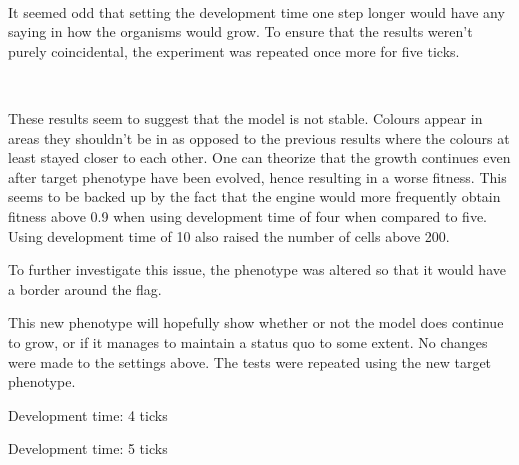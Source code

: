 \begin{center}
	~
	~
\end{center}

It seemed odd that setting the development time one step longer would have any saying in how the organisms would grow. To ensure that the results weren't purely coincidental, the experiment was repeated once more for five ticks.

\begin{center}
	~
	~
\end{center}

These results seem to suggest that the model is not stable. Colours appear in areas they shouldn't be in as opposed to the previous results where the colours at least stayed closer to each other. One can theorize that the growth continues even after target phenotype have been evolved, hence resulting in a worse fitness. This seems to be backed up by the fact that the engine would more frequently obtain fitness above 0.9 when using development time of four when compared to five. Using development time of 10 also raised the number of cells above 200.

To further investigate this issue, the phenotype was altered so that it would have a border around the flag.

\begin{center}\end{center}

This new phenotype will hopefully show whether or not the model does continue to grow, or if it manages to maintain a status quo to some extent. No changes were made to the settings above. The tests were repeated using the new target phenotype.

\begin{center}
	Development time: 4 ticks\newline
	~
\end{center}

\begin{center}
	Development time: 5 ticks\newline
	~
	~
\end{center}

